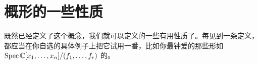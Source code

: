 
\chapter{概形的一些性质}
\label{ch:properties-of-schemes}

既然已经定义了\trScheme{}这个概念，我们就可以定义\trScheme{}的一些有用性质了。每见到一条定义，都应当在你自选的具体例子上把它试用一番，比如你最钟爱的那些形如 $\operatorname{Spec}\mathbb{C}[x_1,\dots,x_n]/(f_1,\dots,f_r)$ 的\trScheme。





